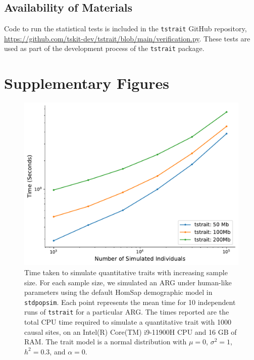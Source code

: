 \documentclass{article}
\begin{document}
\subsection{Availability of Materials}

Code to run the statistical tests is included in the \texttt{tstrait} GitHub repository, \url{https://github.com/tskit-dev/tstrait/blob/main/verification.py}. These tests are used as part of the development process of the \texttt{tstrait} package.

\section{Supplementary Figures}

\renewcommand\thefigure{S\arabic{figure}}
\setcounter{figure}{0}
\renewcommand\thetable{S\arabic{table}}
\setcounter{table}{0}

\begin{figure}[h]%
\centering
\includegraphics[width=0.7\columnwidth]{figures/stdpopsim-time.pdf}
\caption{Time taken to simulate quantitative traits with increasing
sample size. For each sample size, we simulated an ARG under human-like
parameters using the default HomSap demographic model in \texttt{stdpopsim}.
Each point represents the mean time for 10 independent runs of \texttt{tstrait}
for a particular ARG. The times reported are the total CPU
time required to simulate a quantitative trait with 1000 causal sites,
on an Intel(R) Core(TM) i9-11900H CPU and 16 GB of RAM.
The trait model is a normal distribution with $\mu=0$,
$\sigma^2=1$, $h^2=0.3$, and $\alpha=0$.
}\label{fig:time}
\end{figure}

\newpage



\end{document}
